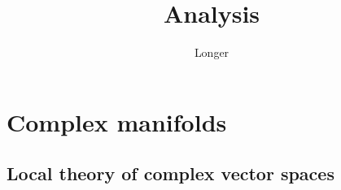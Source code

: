\documentclass[11pt]{book}
\title{Analysis}
\author{Longer}
\theoremstyle{definition}
\begin{document}
\maketitle
\tableofcontents
\setlength{\abovedisplayskip}{5pt}
\setlength{\belowdisplayskip}{5pt}

%
%
%
%
%
%
%
%
%
%
%
%
%
%
\chapter{Complex manifolds}
\section{Local theory of complex vector spaces}
\end{document}
